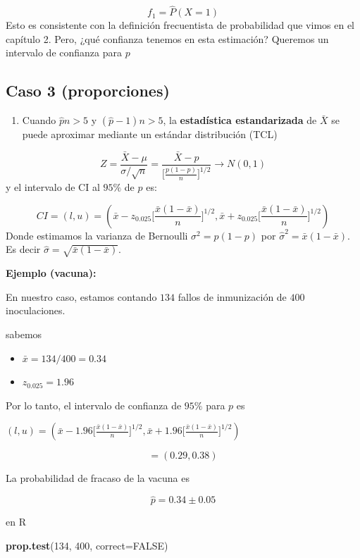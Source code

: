 \documentclass[
]{book}
\newenvironment{Shaded}{\begin{snugshade}}{\end{snugshade}}
\newcommand{\AttributeTok}[1]{\textcolor[rgb]{0.13,0.29,0.53}{#1}}
\newcommand{\ConstantTok}[1]{\textcolor[rgb]{0.56,0.35,0.01}{#1}}
\newcommand{\DecValTok}[1]{\textcolor[rgb]{0.00,0.00,0.81}{#1}}
\newcommand{\FunctionTok}[1]{\textcolor[rgb]{0.13,0.29,0.53}{\textbf{#1}}}
\newcommand{\NormalTok}[1]{#1}
\providecommand{\tightlist}{%
  \setlength{\itemsep}{0pt}\setlength{\parskip}{0pt}}
\begin{document}
\[f_1 =\hat{P}(X=1)\]
Esto es consistente con la definición frecuentista de probabilidad que vimos en el capítulo 2. Pero, ¿qué confianza tenemos en esta estimación? Queremos un intervalo de confianza para \(p\)

\hypertarget{caso-3-proporciones}{%
\subsection{Caso 3 (proporciones)}\label{caso-3-proporciones}}

\begin{enumerate}
\def\labelenumi{\arabic{enumi}.}
\tightlist
\item
  Cuando \(\hat{p}n>5\) y \((\hat{p}-1)n>5\), la \textbf{estadística estandarizada} de \(\bar{X}\) se puede aproximar mediante un estándar distribución (TCL)
\end{enumerate}

\[Z=\frac{\bar{X}-\mu}{\sigma/\sqrt{n}}= \frac{\bar{X}-p}{\big[\frac{p(1-p)}{n} \big]^{1/2}}\rightarrow N(0,1)\]
y el intervalo de CI al \(95\%\) de \(p\) es:

\[CI=(l,u)=(\bar{x}-z_{0.025}\big[\frac{\bar{x}(1-\bar{x})}{n} \big]^{ 1/2}, \bar{x}+z_{0.025}\big[\frac{\bar{x}(1-\bar{x})}{n} \big]^{1/2})\]
Donde estimamos la varianza de Bernoulli \(\sigma^2=p(1-p)\) por \(\hat{\sigma}^2=\bar{x}(1-\bar{x})\). Es decir \(\hat{\sigma}=\sqrt{\bar{x}(1-\bar{x})}\).

\textbf{Ejemplo (vacuna):}

En nuestro caso, estamos contando \(134\) fallos de inmunización de \(400\) inoculaciones.

sabemos

\begin{itemize}
\tightlist
\item
  \(\bar{x}=134/400=0.34\)
\item
  \(z_{0.025}=1.96\)
\end{itemize}

Por lo tanto, el intervalo de confianza de \(95\%\) para \(p\) es

\((l,u)=(\bar{x}-1.96 \big[\frac{\bar{x}(1-\bar{x})}{n} \big]^{1/2}, \bar{x}+1.96 \big[\frac{\bar{x}(1-\bar{x})}{n} \big]^{1/2})\)

\[=(0.29,0.38)\]

La probabilidad de fracaso de la vacuna es

\[\hat{p}=0.34 \pm 0.05\]

en R

\begin{Shaded}
\begin{Highlighting}[]
\FunctionTok{prop.test}\NormalTok{(}\DecValTok{134}\NormalTok{, }\DecValTok{400}\NormalTok{, }\AttributeTok{correct=}\ConstantTok{FALSE}\NormalTok{)}
\end{Highlighting}
\end{Shaded}
\end{document}
